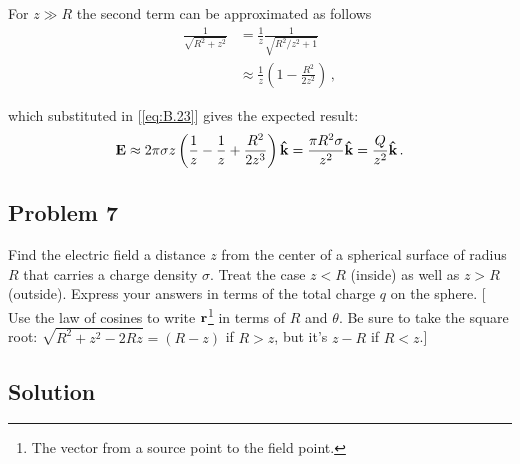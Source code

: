 For $z \gg R$ the second term can be approximated as follows
\begin{align*}
\frac{1}{\sqrt{R^2 + z^2}} &= \frac{1}{z} \frac{1}{\sqrt{R^2/z^2 + 1}}\\
						   &\approx \frac{1}{z} \left(1 - \frac{R^2}{2z^2}\right)\,,
\end{align*}

which substituted in [\ref{eq:B.23}] gives the expected result:
\begin{equation}\label{eq:B.25}
\vb{E} \approx  2 \pi \sigma z \left( \frac{1}{z} - \frac{1}{z} + \frac{R^2}{2z^3} \right) \vu{k} = \frac{\pi R^2 \sigma}{z^2} \vu{k} = \frac{Q}{z^2}  \vu{k}\,.
\end{equation}





\subsection*{Problem 7}

Find the electric field a distance $z$ from the center of a spherical surface of radius $R$ that carries a charge density $\sigma$. Treat the case $z < R$ (inside) as well as $z > R$ (outside). Express your answers in terms of the total charge $q$ on the sphere. [ Use the law of cosines to write $\vb{r}$\footnote{The vector from a source point to the field point.} in terms of $R$ and $\theta$. Be sure to take the  square root: $\sqrt{R^2 + z^2 - 2Rz} = (R - z)$ if $R > z$, but it's $z - R$ if $R < z$.]

\subsection*{Solution}









